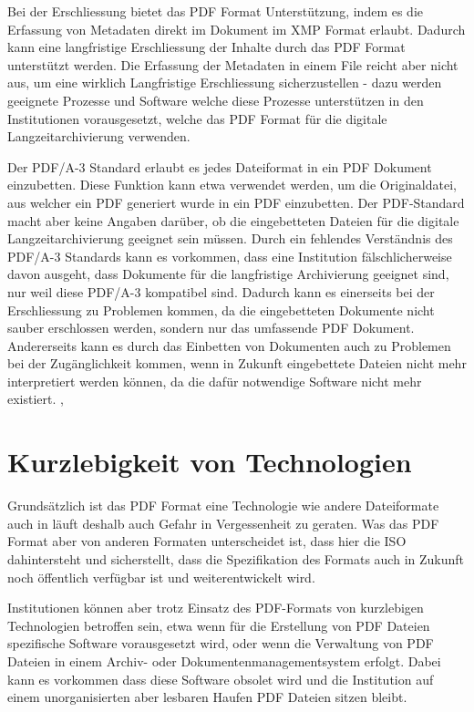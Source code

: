 \documentclass[a4paper,oneside, 12pt]{report}
\begin{document}
 Bei der Erschliessung bietet das PDF Format Unterstützung, indem es die Erfassung von Metadaten direkt im Dokument im \ac{XMP} Format erlaubt. Dadurch kann eine langfristige Erschliessung der Inhalte durch das PDF Format unterstützt werden. Die Erfassung der Metadaten in einem File reicht aber nicht aus, um eine wirklich Langfristige Erschliessung sicherzustellen - dazu werden geeignete Prozesse und Software welche diese Prozesse unterstützen in den Institutionen vorausgesetzt, welche das PDF Format für die digitale Langzeitarchivierung verwenden.

 Der PDF/A-3 Standard erlaubt es jedes Dateiformat in ein PDF Dokument einzubetten. Diese Funktion kann etwa verwendet werden, um die Originaldatei, aus welcher ein PDF generiert wurde in ein PDF einzubetten. Der PDF-Standard macht aber keine Angaben darüber, ob die eingebetteten Dateien für die digitale Langzeitarchivierung geeignet sein müssen. Durch ein fehlendes Verständnis des PDF/A-3 Standards kann es vorkommen, dass eine Institution fälschlicherweise davon ausgeht, dass Dokumente für die langfristige Archivierung geeignet sind, nur weil diese PDF/A-3 kompatibel sind. Dadurch kann es einerseits bei der Erschliessung zu Problemen kommen, da die eingebetteten Dokumente nicht sauber erschlossen werden, sondern nur das umfassende PDF Dokument. Andererseits kann es durch das Einbetten von Dokumenten auch zu Problemen bei der Zugänglichkeit kommen, wenn in Zukunft eingebettete Dateien nicht mehr interpretiert werden können, da die dafür notwendige Software nicht mehr existiert. \cite{pdftools}, \cite{pdfanutshell}

\section{Kurzlebigkeit von Technologien}
Grundsätzlich ist das PDF Format eine Technologie wie andere Dateiformate auch in läuft deshalb auch Gefahr in Vergessenheit zu geraten. Was das PDF Format aber von anderen Formaten unterscheidet ist, dass hier die \ac{ISO} dahintersteht und sicherstellt, dass die Spezifikation des Formats auch in Zukunft noch öffentlich verfügbar ist und weiterentwickelt wird. 

Institutionen können aber trotz Einsatz des PDF-Formats von kurzlebigen Technologien betroffen sein, etwa wenn für die Erstellung von PDF Dateien spezifische Software vorausgesetzt wird, oder wenn die Verwaltung von PDF Dateien in einem Archiv- oder Dokumentenmanagementsystem erfolgt. Dabei kann es vorkommen dass diese Software obsolet wird und die Institution auf einem unorganisierten aber lesbaren Haufen PDF Dateien sitzen bleibt.
\end{document}
